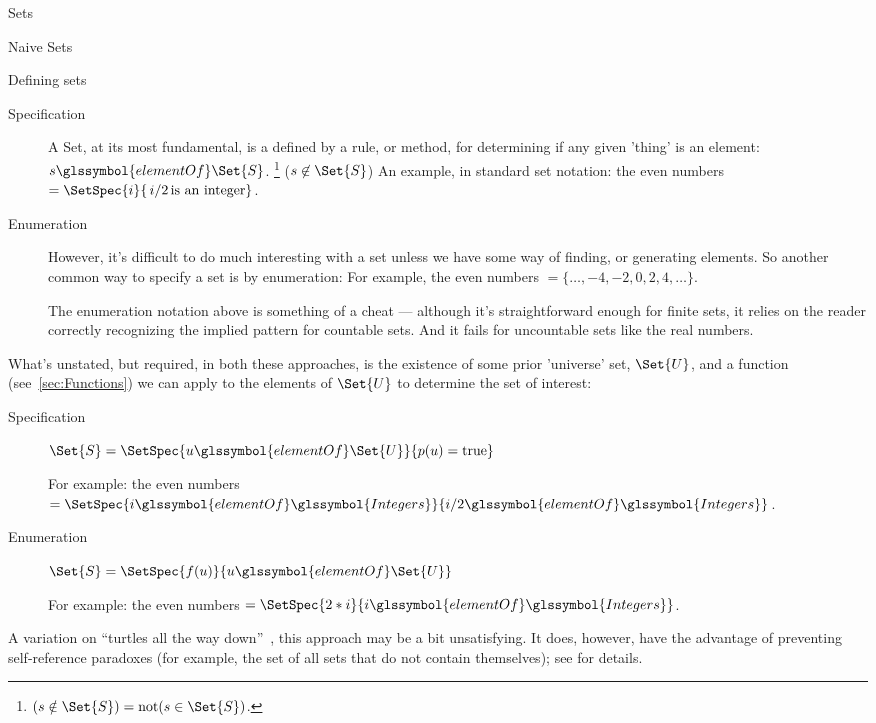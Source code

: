 \begin{plSection}{Sets}
\begin{plSection}{Naive Sets}
\begin{plSection}{Defining sets}
\begin{description}

\item[Specification]

A \gls{Set}, at its most fundamental, is a defined by a rule,
or method,
for determining if any given 'thing' is an element: 
$s \glssymbol{elementOf} \Set{S}$.
\footnote{$(s \notin \Set{S}) = \text{not}(s \in \Set{S})$.}
($s \not\in \Set{S}$)
An example, in standard set notation:
the even numbers 
$= \SetSpec{ i }{ \, i/2 \, \text{is an integer} }$.

\item[Enumeration]

However, it's difficult to do much interesting with a set
unless we have some way of finding, or generating elements.
So another common way to specify a set is by enumeration:
For example, the even numbers $= \{ \ldots, -4, -2, 0, 2 ,4,
\ldots \}$.

The enumeration notation above is something of a cheat ---
although it's straightforward enough for finite sets, it relies on
the reader correctly recognizing the implied pattern for countable
sets.
And it fails for uncountable sets like the real numbers.

\end{description}

What's unstated, but required, in both these approaches, is the
existence of some prior 'universe' set, $\Set{U}$, and a function
(see~\cref{sec:Functions}) we can apply to the elements of
$\Set{U}$ to determine the set of interest:

\begin{description}
\item[Specification] 
$\Set{S} =
\SetSpec{ u \glssymbol{elementOf} \Set{U} }{ p(u) = \text{true} }$ 

For example: the even numbers
 $= \SetSpec{ i \glssymbol{elementOf} 
\glssymbol{Integers} }{
 i/2 \glssymbol{elementOf} \glssymbol{Integers} }$.

\item[Enumeration]
$\Set{S} =
\SetSpec{ f(u) }{ u \glssymbol{elementOf} \Set{U} }$ 

For example: the even numbers 
$= \SetSpec{ 2*i }{ i \glssymbol{elementOf} \glssymbol{Integers} }$.

\end{description}
A variation on 
``turtles all the way down''~\cite{Munroe:2014:XKCDTurtles, wiki:Turtles},
this approach may be a bit unsatisfying.
It does, however, have the advantage of preventing self-reference
paradoxes (for example, 
the set of all sets that do not contain themselves); 
see 
for details.


\end{plSection}
\end{plSection}
\end{plSection}
